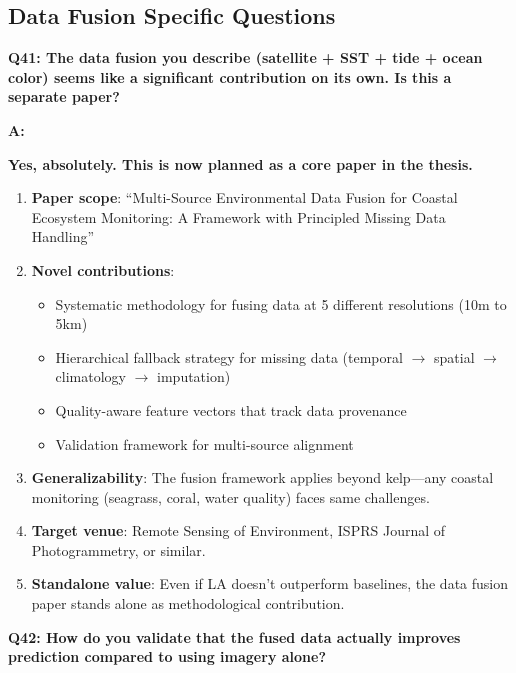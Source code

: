 \documentclass[11pt]{article}
\begin{document}
\subsection{Data Fusion Specific Questions}

\textbf{Q41: The data fusion you describe (satellite + SST + tide + ocean color) seems like a significant contribution on its own. Is this a separate paper?}

\textbf{A:}

\textbf{Yes, absolutely. This is now planned as a core paper in the thesis.}

\begin{enumerate}
    \item \textbf{Paper scope}: ``Multi-Source Environmental Data Fusion for Coastal Ecosystem Monitoring: A Framework with Principled Missing Data Handling''

    \item \textbf{Novel contributions}:
    \begin{itemize}
        \item Systematic methodology for fusing data at 5 different resolutions (10m to 5km)
        \item Hierarchical fallback strategy for missing data (temporal $\to$ spatial $\to$ climatology $\to$ imputation)
        \item Quality-aware feature vectors that track data provenance
        \item Validation framework for multi-source alignment
    \end{itemize}

    \item \textbf{Generalizability}: The fusion framework applies beyond kelp---any coastal monitoring (seagrass, coral, water quality) faces same challenges.

    \item \textbf{Target venue}: Remote Sensing of Environment, ISPRS Journal of Photogrammetry, or similar.

    \item \textbf{Standalone value}: Even if LA doesn't outperform baselines, the data fusion paper stands alone as methodological contribution.
\end{enumerate}

\textbf{Q42: How do you validate that the fused data actually improves prediction compared to using imagery alone?}
\end{document}
